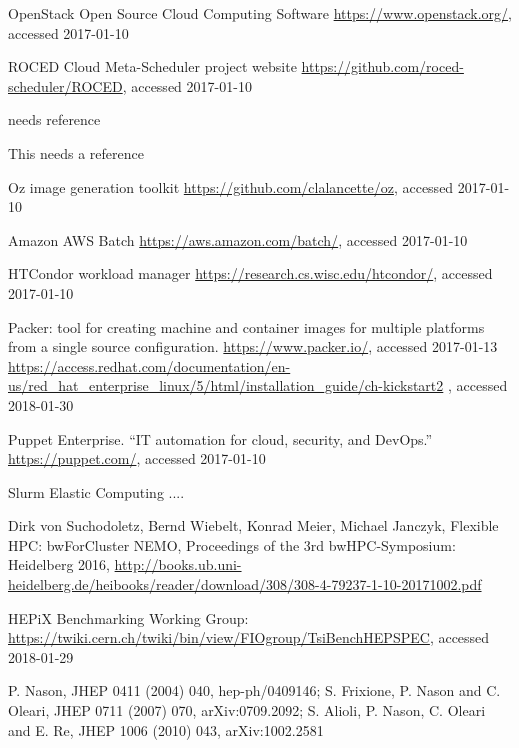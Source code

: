 \begin{thebibliography}{}
%
%
OpenStack Open Source Cloud Computing Software
\url{https://www.openstack.org/}, accessed 2017-01-10

ROCED Cloud Meta-Scheduler project website
\url{https://github.com/roced-scheduler/ROCED}, accessed 2017-01-10

needs reference
  
  This needs a reference

Oz image generation toolkit
\url{https://github.com/clalancette/oz}, accessed 2017-01-10

Amazon AWS Batch
\url{https://aws.amazon.com/batch/}, accessed 2017-01-10

HTCondor workload manager
\url{https://research.cs.wisc.edu/htcondor/}, accessed 2017-01-10


Packer: tool for creating machine and container images for multiple platforms from a single source configuration. 
\url{https://www.packer.io/}, accessed 2017-01-13
\url{https://access.redhat.com/documentation/en-us/red_hat_enterprise_linux/5/html/installation_guide/ch-kickstart2}
, accessed 2018-01-30


Puppet Enterprise. ``IT automation for cloud, security, and DevOps.''
\url{https://puppet.com/}, accessed 2017-01-10

Slurm Elastic Computing ....


Dirk von Suchodoletz, Bernd Wiebelt, Konrad Meier, Michael Janczyk,
  Flexible HPC: bwForCluster NEMO,
  Proceedings of the 3rd bwHPC-Symposium: Heidelberg 2016,
  \url{http://books.ub.uni-heidelberg.de/heibooks/reader/download/308/308-4-79237-1-10-20171002.pdf}

 HEPiX Benchmarking Working Group:
\url{https://twiki.cern.ch/twiki/bin/view/FIOgroup/TsiBenchHEPSPEC}, accessed 2018-01-29

   P. Nason, JHEP 0411 (2004) 040, hep-ph/0409146;
    S. Frixione, P. Nason and C. Oleari, JHEP 0711 (2007) 070, arXiv:0709.2092;
    S. Alioli, P. Nason, C. Oleari and E. Re, JHEP 1006 (2010) 043, arXiv:1002.2581


\end{thebibliography}
